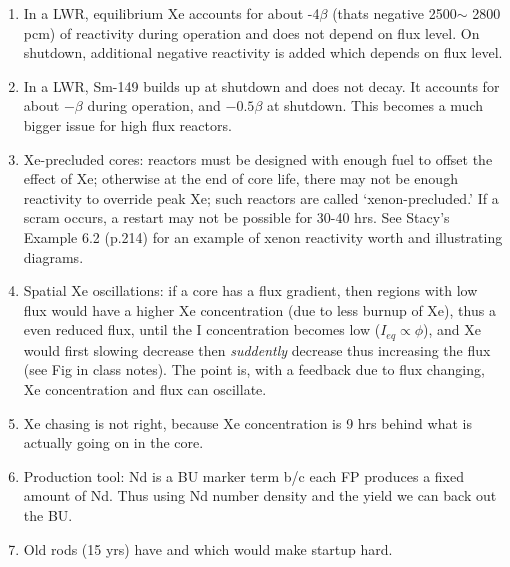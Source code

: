 \documentclass{school-22.211-notes}
\begin{document}
\begin{enumerate}
\item In a LWR, equilibrium Xe accounts for about -4$\beta$ (thats negative 2500$\sim$ 2800 pcm) of reactivity during operation and does not depend on flux level. On shutdown, additional negative reactivity is added which depends on flux level. 

\item In a LWR, Sm-149 builds up at shutdown and does not decay. It accounts for about $-\beta$ during operation, and $-0.5\beta$ at shutdown. This becomes a much bigger issue for high flux reactors. 

\item Xe-precluded cores: reactors must be designed with enough fuel to offset the effect of Xe; otherwise at the end of core life, there may not be enough reactivity to override peak Xe; such reactors are called `xenon-precluded.' If a scram occurs, a restart may not be possible for 30-40 hrs. See Stacy's Example 6.2 (p.214) for an example of xenon reactivity worth and illustrating diagrams. 

\item Spatial Xe oscillations: if a core has a flux gradient, then regions with low flux would have a higher Xe concentration (due to less burnup of Xe), thus a even reduced flux, until the I concentration becomes low ($I_{eq} \propto \phi$), and Xe would first slowing decrease then \textit{suddently} decrease thus increasing the flux (see Fig in class notes). The point is, with a feedback due to flux changing, Xe concentration and flux can oscillate. 

\item Xe chasing is not right, because Xe concentration is 9 hrs behind what is actually going on in the core. 

\item Production tool: Nd is a BU marker term b/c each FP produces a fixed amount of Nd. Thus using Nd number density and the yield we can back out the BU. 

\item Old rods (15 yrs) have  and  which would make startup hard. 


\end{enumerate}
\end{document}

